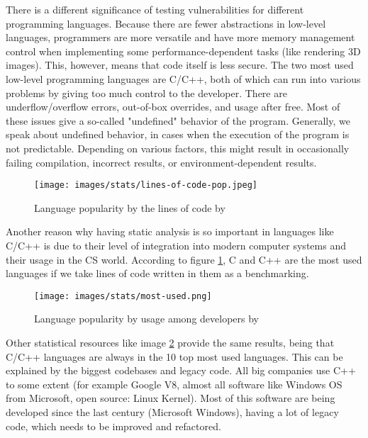 There is a different significance of testing vulnerabilities for different programming languages. Because there are fewer abstractions in low-level languages, programmers are more versatile and have more memory management control when implementing some performance-dependent tasks (like rendering 3D images). This, however, means that code itself is less secure. The two most used low-level programming languages are C/C++, both of which can run into various problems by giving too much control to the developer. There are underflow/overflow errors, out-of-box overrides, and usage after free. Most of these issues give a so-called "undefined" behavior of the program. Generally, we speak about undefined behavior, in cases when the execution of the program is not predictable. Depending on various factors, this might result in occasionally failing compilation, incorrect results, or environment-dependent results.

\begin{figure}[H]
	\centering
        \caption{Language popularity by the lines of code by \cite{lang-popularity}}
	\texttt{[image: images/stats/lines-of-code-pop.jpeg]}
	\label{fig:language-line-of-code}
\end{figure}


Another reason why having static analysis is so important in languages like C/C++ is due to their level of integration into modern computer systems and their usage in the CS world. According to figure \ref{fig:language-line-of-code}, C and C++ are the most used languages if we take lines of code written in them as a benchmarking. 

\begin{figure}[H]
	\centering
        \caption{Language popularity by usage among developers by \cite{lang-pop-devs} }
	\texttt{[image: images/stats/most-used.png]}
	\label{fig:languages-top-10}
\end{figure}

Other statistical resources like image \ref{fig:languages-top-10} provide the same results, being that C/C++ languages are always in the 10 top most used languages. This can be explained by the biggest codebases and legacy code. All big companies use C++ to some extent (for example Google V8, almost all software like Windows OS from Microsoft, open source: Linux Kernel). Most of this software are being developed since the last century (Microsoft Windows), having a lot of legacy code, which needs to be improved and refactored. 

